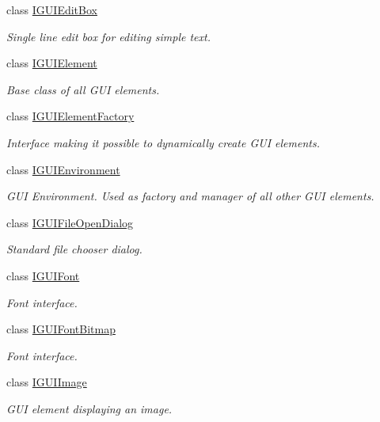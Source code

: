 \begin{DoxyCompactItemize}
class \hyperlink{classirr_1_1gui_1_1IGUIEditBox}{I\+G\+U\+I\+Edit\+Box}
\begin{DoxyCompactList}\small\item\em Single line edit box for editing simple text. \end{DoxyCompactList}\item 
class \hyperlink{classirr_1_1gui_1_1IGUIElement}{I\+G\+U\+I\+Element}
\begin{DoxyCompactList}\small\item\em Base class of all G\+UI elements. \end{DoxyCompactList}\item 
class \hyperlink{classirr_1_1gui_1_1IGUIElementFactory}{I\+G\+U\+I\+Element\+Factory}
\begin{DoxyCompactList}\small\item\em Interface making it possible to dynamically create G\+UI elements. \end{DoxyCompactList}\item 
class \hyperlink{classirr_1_1gui_1_1IGUIEnvironment}{I\+G\+U\+I\+Environment}
\begin{DoxyCompactList}\small\item\em G\+UI Environment. Used as factory and manager of all other G\+UI elements. \end{DoxyCompactList}\item 
class \hyperlink{classirr_1_1gui_1_1IGUIFileOpenDialog}{I\+G\+U\+I\+File\+Open\+Dialog}
\begin{DoxyCompactList}\small\item\em Standard file chooser dialog. \end{DoxyCompactList}\item 
class \hyperlink{classirr_1_1gui_1_1IGUIFont}{I\+G\+U\+I\+Font}
\begin{DoxyCompactList}\small\item\em Font interface. \end{DoxyCompactList}\item 
class \hyperlink{classirr_1_1gui_1_1IGUIFontBitmap}{I\+G\+U\+I\+Font\+Bitmap}
\begin{DoxyCompactList}\small\item\em Font interface. \end{DoxyCompactList}\item 
class \hyperlink{classirr_1_1gui_1_1IGUIImage}{I\+G\+U\+I\+Image}
\begin{DoxyCompactList}\small\item\em G\+UI element displaying an image. \end{DoxyCompactList}\item 

\end{DoxyCompactItemize}
